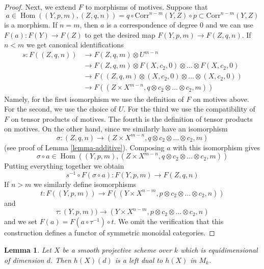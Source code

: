 \documentclass{stacks-project}
\theoremstyle{plain}
\newtheorem{lemma}[subsection]{Lemma}
\theoremstyle{definition}
\theoremstyle{remark}
\numberwithin{equation}{subsection}
\def\Hom{\mathop{\mathrm{Hom}}\nolimits}
\begin{document}
\begin{proof}
\medskip\noindent
Next, we extend $F$ to morphisms of motives. Suppose that
$$
a \in
\Hom((Y, p, m), (Z, q, n)) =
q \circ \text{Corr}^{n - m}(Y, Z) \circ p \subset \text{Corr}^{n - m}(Y, Z)
$$
is a morphism. If $n = m$, then $a$ is a correspondence of degree $0$
and we can use $F(a) : F(Y) \to F(Z)$ to get the desired map
$F(Y, p, m) \to F(Z, q, n)$. If $n < m$ we get canonical identifications
\begin{align*}
s : F((Z, q, n))
& \to
F(Z, q, m) \otimes U^{m - n} \\
& \to
F(Z, q, m) \otimes F(X, c_2, 0) \otimes \ldots \otimes F(X, c_2, 0) \\
& \to
F((Z, q, m) \otimes (X, c_2, 0) \otimes \ldots \otimes (X, c_2, 0)) \\
& \to
F((Z \times X^{m - n}, q \otimes c_2 \otimes \ldots \otimes c_2, m))
\end{align*}
Namely, for the first isomorphism we use the definition of $F$ on motives
above. For the second, we use the choice of $U$. For the third we use
the compatibility of $F$ on tensor products of motives. The fourth
is the definition of tensor products on motives. On the other hand, since
we similarly have an isomorphism
$$
\sigma : (Z, q, n) \to
(Z \times X^{m - n}, q \otimes c_2 \otimes \ldots \otimes c_2, m)
$$
(see proof of Lemma \ref{lemma-additive}). Composing $a$ with this isomorphism
gives
$$
\sigma \circ a \in
\Hom((Y, p, m),
(Z \times X^{m - n}, q \otimes c_2 \otimes \ldots \otimes c_2, m))
$$
Putting everything together we obtain
$$
s^{-1} \circ F(\sigma \circ a) :
F(Y, p, m) \to
F(Z, q, n)
$$
If $n > m$ we similarly define isomorphisms
$$
t : F((Y, p, m)) \to
F((Y \times X^{n - m}, p \otimes c_2 \otimes \ldots \otimes c_2, n))
$$
and
$$
\tau : (Y, p, m)) \to
(Y \times X^{n - m}, p \otimes c_2 \otimes \ldots \otimes c_2, n)
$$
and we set $F(a) = F(a \circ \tau^{-1}) \circ t$.
We omit the verification that this construction defines a functor
of symmetric monoidal categories.
\end{proof}

\begin{lemma}
\label{lemma-dual}
Let $X$ be a smooth projective scheme over $k$ which is equidimensional
of dimension $d$. Then $h(X)(d)$ is a left dual to $h(X)$ in $M_k$.
\end{lemma}
\end{document}

